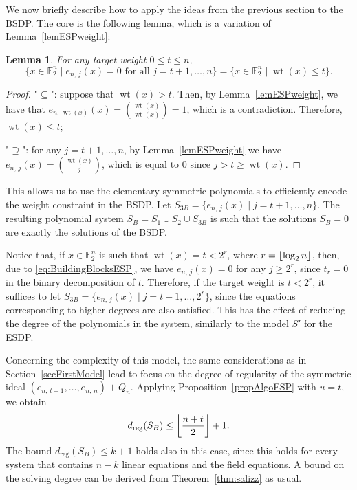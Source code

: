 \documentclass[11pt]{article}
\newcommand{\F}[0]{\mathbb{F}}
\newcommand{\es}[2]{e_{#1,\, #2}}
\DeclarePairedDelimiter{\fl}{\lfloor}{\rfloor}
\theoremstyle{plain}
\newtheorem{lem}[theo]{Lemma}
\theoremstyle{definition}
\theoremstyle{remark}
\begin{document}
We now briefly describe how to apply the ideas from the previous section to the BSDP. The core is the following lemma, which is a variation of Lemma~\ref{lemESPweight}:
\begin{lem}\label{lemBSDP2}
    For any target weight $0\leq t\leq n$,
    \begin{equation*}
        \{x\in\F_2^n\mid\es{n}{j}(x)=0\text{ for all }j=t+1,\dots,n\}=\{x\in\F_2^n\mid\operatorname{wt}(x)\leq t\}.
    \end{equation*}
\end{lem}
\begin{proof}
    "$\subseteq$": suppose that $\operatorname{wt}(x)>t$. Then, by Lemma~\ref{lemESPweight}, we have that $\es{n}{\operatorname{wt}(x)}(x)=\binom{\operatorname{wt}(x)}{\operatorname{wt}(x)}=1$, which is a contradiction. Therefore, $\operatorname{wt}(x)\leq t$;
    
    "$\supseteq$": for any $j=t+1,\dots,n$, by Lemma~\ref{lemESPweight} we have $\es{n}{j}(x)=\binom{\operatorname{wt}(x)}{j}$, which is equal to $0$ since $j>t\geq\operatorname{wt}(x)$.
    
\end{proof}
This allows us to use the elementary symmetric polynomials to efficiently encode the weight constraint in the BSDP. Let $S_{3B}=\{\es{n}{j}(x)\mid j=t+1,\dots,n\}$. The resulting polynomial system $S_B=S_1\cup S_2\cup S_{3B}$ is such that the solutions $S_B=0$ are exactly the solutions of the BSDP.

Notice that, if $x\in\F_2^n$ is such that $\operatorname{wt}(x)=t<2^r$, where $r=\fl*{\operatorname{log}_2 n}$, then, due to \eqref{eq:BuildingBlocksESP}, we have $\es{n}{j}(x)=0$ for any $j\geq 2^r$, since $t_r=0$ in the binary decomposition of $t$. Therefore, if the target weight is $t<2^r$, it suffices to let $S_{3B}=\{\es{n}{j}(x)\mid j=t+1,\dots,2^r\}$, since the equations corresponding to higher degrees are also satisfied. This has the effect of reducing the degree of the polynomials in the system, similarly to the model $S'$ for the ESDP.

Concerning the complexity of this model, the same considerations as in Section~\ref{secFirstModel} lead to focus on the degree of regularity of the symmetric ideal $(\es{n}{t+1},\dots,\es{n}{n})+Q_n$. Applying Proposition~\ref{propAlgoESP} with $u=t$, we obtain
\begin{equation*}
    d_{\operatorname{reg}}(S_B)\leq\fl*{\frac{n+t}{2}}+1.
\end{equation*}
The bound $d_{\operatorname{reg}}(S_B)\leq k+1$ holds also in this case, since this holds for every system that contains $n-k$ linear equations and the field equations. A bound on the solving degree can be derived from Theorem~\ref{thm:salizz} as usual.
\end{document}
